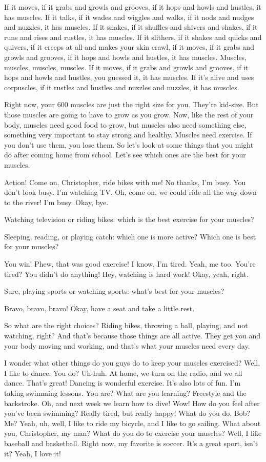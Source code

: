 If it moves, if it grabs and growls and grooves, if it hops and howls and hustles, it has muscles. If it talks, if it wades and wiggles and walks, if it nods and nudges and nuzzles, it has muscles. If it snakes, if it shuffles and shivers and shakes, if it runs and rises and rustles, it has muscles. If it slithers, if it shakes and quicks and quivers, if it creeps at all and makes your skin crawl, if it moves, if it grabs and growls and grooves, if it hops and howls and hustles, it has muscles. Muscles, muscles, muscles, muscles. If it moves, if it grabs and growls and grooves, if it hops and howls and hustles, you guessed it, it has muscles. If it's alive and uses corpuscles, if it rustles and hustles and nuzzles and nuzzles, it has muscles.

Right now, your 600 muscles are just the right size for you. They're kid-size. But those muscles are going to have to grow as you grow. Now, like the rest of your body, muscles need good food to grow, but muscles also need something else, something very important to stay strong and healthy. Muscles need exercise. If you don't use them, you lose them. So let's look at some things that you might do after coming home from school. Let's see which ones are the best for your muscles.

Action!
Come on, Christopher, ride bikes with me!
No thanks, I'm busy.
You don't look busy.
I'm watching TV.
Oh, come on, we could ride all the way down to the river!
I'm busy.
Okay, bye.

Watching television or riding bikes: which is the best exercise for your muscles?

Sleeping, reading, or playing catch: which one is more active? Which one is best for your muscles?

You win!
Phew, that was good exercise!
I know, I'm tired.
Yeah, me too.
You're tired? You didn't do anything!
Hey, watching is hard work!
Okay, yeah, right.

Sure, playing sports or watching sports: what's best for your muscles?

Bravo, bravo, bravo! Okay, have a seat and take a little rest.

So what are the right choices? Riding bikes, throwing a ball, playing, and not watching, right? And that's because those things are all active. They get you and your body moving and working, and that's what your muscles need every day.

I wonder what other things do you guys do to keep your muscles exercised?
Well, I like to dance.
You do?
Uh-huh. At home, we turn on the radio, and we all dance.
That's great! Dancing is wonderful exercise. It's also lots of fun.
I'm taking swimming lessons.
You are? What are you learning?
Freestyle and the backstroke. Oh, and next week we learn how to dive!
Wow! How do you feel after you've been swimming?
Really tired, but really happy!
What do you do, Bob?
Me? Yeah, uh, well, I like to ride my bicycle, and I like to go sailing.
What about you, Christopher, my man? What do you do to exercise your muscles?
Well, I like baseball and basketball. Right now, my favorite is soccer.
It's a great sport, isn't it?
Yeah, I love it!


